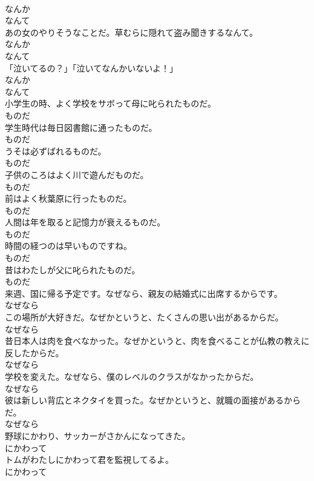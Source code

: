 \documentclass[8pt]{extreport}
\begin{document}
\begin{CJK}{UTF8}{min}
\\	なんか 
\\	なんて
\\	あの女のやりそうなことだ。草むらに隠れて盗み聞きするなんて。	
\\	なんか 
\\	なんて
\\	「泣いてるの？」「泣いてなんかいないよ！」	
\\	なんか 
\\	なんて
\\	小学生の時、よく学校をサボって母に叱られたものだ。	
\\	ものだ
\\	学生時代は毎日図書館に通ったものだ。	
\\	ものだ
\\	うそは必ずばれるものだ。	
\\	ものだ
\\	子供のころはよく川で遊んだものだ。	
\\	ものだ
\\	前はよく秋葉原に行ったものだ。	
\\	ものだ
\\	人間は年を取ると記憶力が衰えるものだ。	
\\	ものだ
\\	時間の経つのは早いものですね。	
\\	ものだ
\\	昔はわたしが父に叱られたものだ。	
\\	ものだ
\\	来週、国に帰る予定です。なぜなら、親友の結婚式に出席するからです。	
\\	なぜなら
\\	この場所が大好きだ。なぜかというと、たくさんの思い出があるからだ。	
\\	なぜなら
\\	昔日本人は肉を食べなかった。なぜかというと、肉を食べることが仏教の教えに反したからだ。	
\\	なぜなら
\\	学校を変えた。なぜなら、僕のレベルのクラスがなかったからだ。	
\\	なぜなら
\\	彼は新しい背広とネクタイを買った。なぜかというと、就職の面接があるからだ。	
\\	なぜなら
\\	野球にかわり、サッカーがさかんになってきた。	
\\	にかわって
\\	トムがわたしにかわって君を監視してるよ。	
\\	にかわって

\end{CJK}
\end{document}
